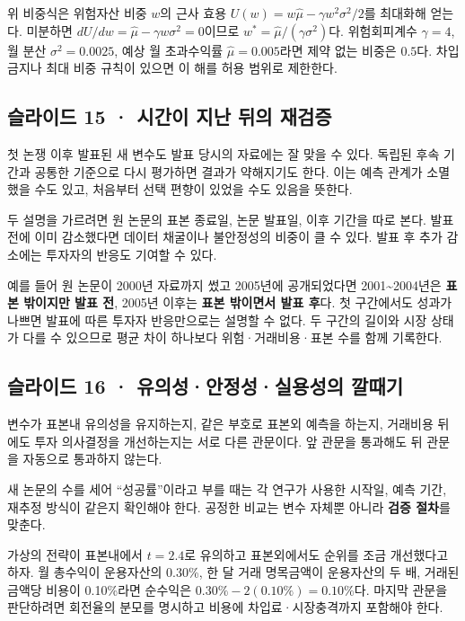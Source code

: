 \documentclass[11pt,a4paper]{article}
\begin{document}
위 비중식은 위험자산 비중 $w$의 근사 효용 $U(w)=w\hat\mu-\gamma w^2\sigma^2/2$를 최대화해 얻는다. 미분하면 $dU/dw=\hat\mu-\gamma w\sigma^2=0$이므로 $w^*=\hat\mu/(\gamma\sigma^2)$다. 위험회피계수 $\gamma=4$, 월 분산 $\sigma^2=0.0025$, 예상 월 초과수익률 $\hat\mu=0.005$라면 제약 없는 비중은 $0.5$다. 차입 금지나 최대 비중 규칙이 있으면 이 해를 허용 범위로 제한한다.\par

\subsection{슬라이드 15 · 시간이 지난 뒤의 재검증}
첫 논쟁 이후 발표된 새 변수도 발표 당시의 자료에는 잘 맞을 수 있다. 독립된 후속 기간과 공통한 기준으로 다시 평가하면 결과가 약해지기도 한다. 이는 예측 관계가 소멸했을 수도 있고, 처음부터 선택 편향이 있었을 수도 있음을 뜻한다.\par

두 설명을 가르려면 원 논문의 표본 종료일, 논문 발표일, 이후 기간을 따로 본다. 발표 전에 이미 감소했다면 데이터 채굴이나 불안정성의 비중이 클 수 있다. 발표 후 추가 감소에는 투자자의 반응도 기여할 수 있다.\par

예를 들어 원 논문이 2000년 자료까지 썼고 2005년에 공개되었다면 2001\~{}2004년은 \textbf{표본 밖이지만 발표 전}, 2005년 이후는 \textbf{표본 밖이면서 발표 후}다. 첫 구간에서도 성과가 나쁘면 발표에 따른 투자자 반응만으로는 설명할 수 없다. 두 구간의 길이와 시장 상태가 다를 수 있으므로 평균 차이 하나보다 위험·거래비용·표본 수를 함께 기록한다.\par

\subsection{슬라이드 16 · 유의성·안정성·실용성의 깔때기}
변수가 표본내 유의성을 유지하는지, 같은 부호로 표본외 예측을 하는지, 거래비용 뒤에도 투자 의사결정을 개선하는지는 서로 다른 관문이다. 앞 관문을 통과해도 뒤 관문을 자동으로 통과하지 않는다.\par

새 논문의 수를 세어 “성공률”이라고 부를 때는 각 연구가 사용한 시작일, 예측 기간, 재추정 방식이 같은지 확인해야 한다. 공정한 비교는 변수 자체뿐 아니라 \textbf{검증 절차}를 맞춘다.\par

가상의 전략이 표본내에서 $t=2.4$로 유의하고 표본외에서도 순위를 조금 개선했다고 하자. 월 총수익이 운용자산의 0.30\%, 한 달 거래 명목금액이 운용자산의 두 배, 거래된 금액당 비용이 0.10\%라면 순수익은 $0.30\%-2(0.10\%)=0.10\%$다. 마지막 관문을 판단하려면 회전율의 분모를 명시하고 비용에 차입료·시장충격까지 포함해야 한다.\par
\end{document}
